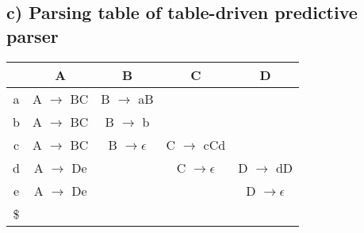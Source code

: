 \documentclass[12pt, A4]{article}
\begin{document}
    \newpage
	\subsection*{c) Parsing table of table-driven predictive parser}
	
	\begin{tabular}{|c|c|c|c|c|}
		\hline 
		   & A & B & C & D \\ 
		\hline 
		a  & A $\rightarrow$ BC & B $\rightarrow$ aB &  &  \\ 
		\hline 
		b  & A $\rightarrow$ BC & B $\rightarrow$ b  &  &  \\ 
		\hline 
		c  & A $\rightarrow$ BC & B $\rightarrow \epsilon$ & C $\rightarrow$ cCd &  \\ 
		\hline 
		d  & A $\rightarrow$ De & & C $\rightarrow \epsilon$ & D $\rightarrow$ dD \\ 
		\hline 
		e  & A $\rightarrow$ De & & & D $\rightarrow \epsilon$ \\ 
		\hline 
		\$ &  &  &  &  \\ 
		\hline 
	\end{tabular} 
	
\end{document}

